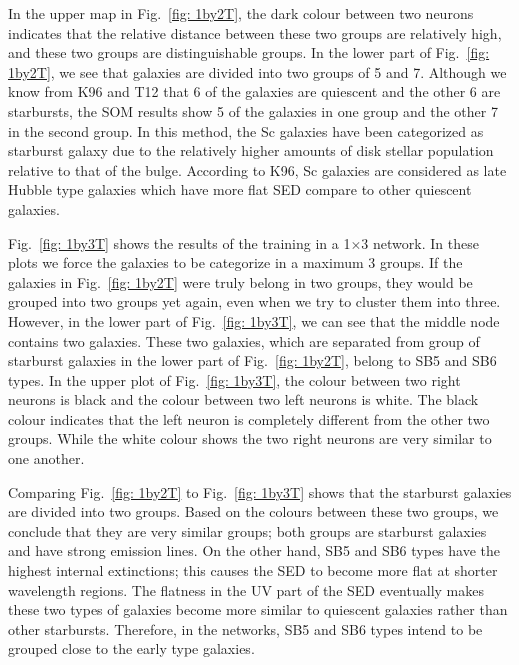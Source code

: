         
            In the upper map in Fig.~\ref{fig: 1by2T}, the dark colour between two neurons indicates that the relative distance between these two groups are relatively high, and these two groups are distinguishable groups.%
            In the lower part of Fig.~\ref{fig: 1by2T}, we see that galaxies are divided into two groups of 5 and 7.
            Although we know from K96 and T12 that 6 of the galaxies are quiescent and the other 6 are starbursts, the SOM results show 5 of the galaxies in one group and the other 7 in the second group.
            In this method, the Sc galaxies have been categorized as starburst galaxy due to the relatively higher amounts of disk stellar population relative to that of the bulge. 
            According to K96, Sc galaxies are considered as late Hubble type galaxies which have more flat SED compare to other quiescent galaxies. 
            

            Fig.~\ref{fig: 1by3T} shows the results of the training in a 1$\times$3 network.
            In these plots we force the galaxies to be categorize in a maximum 3 groups. 
            If the galaxies in Fig.~\ref{fig: 1by2T} were truly belong in two groups, they would be grouped into two groups yet again, even when we try to cluster them into three. 
            However, in the lower part of Fig.~\ref{fig: 1by3T}, we can see that the middle node contains two galaxies.
            These two galaxies, which are separated from group of starburst galaxies in the lower part of Fig.~\ref{fig: 1by2T}, belong to SB5 and SB6 types.
            In the upper plot of Fig.~\ref{fig: 1by3T}, the colour between two right neurons is black and the colour between two left neurons is white. 
            The black colour indicates that the left neuron is completely different from the other two groups.
            While the white colour shows the two right neurons are very similar to one another. 
            
            Comparing Fig.~\ref{fig: 1by2T} to Fig.~\ref{fig: 1by3T} shows that the starburst galaxies are divided into two groups. 
            Based on the colours between these two groups, we conclude that they are very similar groups; both groups are starburst galaxies and have strong emission lines.
            On the other hand, SB5 and SB6 types have the highest internal extinctions; this causes the SED to become more flat at shorter wavelength regions. 
            The flatness in the UV part of the SED eventually makes these two types of galaxies become more similar to quiescent galaxies rather than other starbursts.
            Therefore, in the networks, SB5 and SB6 types intend to be grouped close to the early type galaxies.
                
